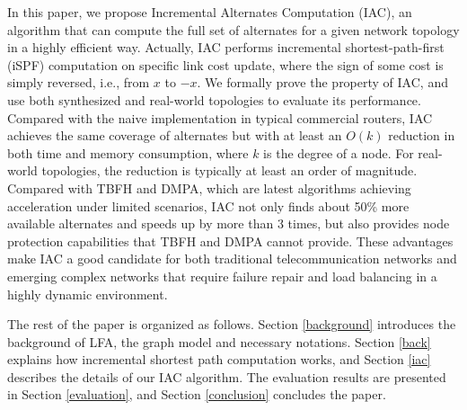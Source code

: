 In this paper, we propose Incremental Alternates Computation (IAC), an algorithm that can
compute the full set of alternates for a given network topology in a highly efficient way.
Actually, IAC performs incremental shortest-path-first (iSPF) computation on specific link 
cost update, 
where the sign of some cost is simply reversed, i.e., from $x$ to $-x$. 
We formally prove the property of IAC,
and use both synthesized and real-world topologies to evaluate its performance.
Compared with the naive implementation in typical commercial routers, IAC achieves the same coverage of alternates but
with at least an $O(k)$ reduction in both time and memory consumption, where $k$ is the degree of a node. For real-world topologies, the reduction is typically at least an order of magnitude. 
Compared with TBFH and DMPA, which are latest algorithms achieving acceleration under limited scenarios,
IAC not only finds about 50\% more available alternates and speeds up by more than 3 times,
but also provides node protection capabilities that TBFH and DMPA cannot provide.
These advantages make IAC a good candidate for both traditional telecommunication networks
and emerging complex networks that require failure repair and load balancing
in a highly dynamic environment.
\iffalse
Our contributions are summarized as follows:
\begin{itemize}
\item We propose an incremental alternates computation (IAC) algorithm based on iSPF, which can compute all the next hops satisfied DC rule. %
\item Theoretical analysis indicates that the computation complexity of IAC is less than that of constructing a shortest path tree and  can provide the same network availability as DC.
\item We propose an IAC algorithm which can  efficiently calculate
the minimum cost of all its neighbors to all other nodes of the
network on the shortest path tree rooted at the compute node. Therefore
IAC can completely and efficiently deal with LFA problem.
\item Theoretical analysis and experiments results indicate that IAC can provide the same network availability as LFA.
\end{itemize}
\fi

The rest of the paper is organized as follows.
Section \ref{background} introduces the background of LFA, the graph model and necessary notations. Section \ref{back} explains how incremental shortest path computation works, 
and Section \ref{iac} describes the details of our IAC algorithm. The evaluation results are 
presented in Section \ref{evaluation}, and Section \ref{conclusion} concludes the paper.




